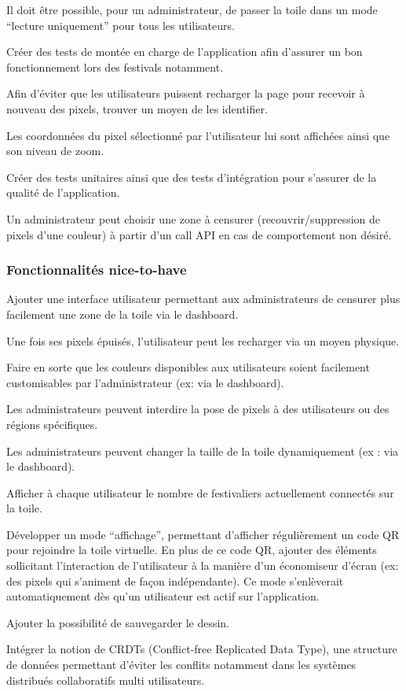 \begin{todolist}
  \item[\done] Il doit être possible, pour un administrateur, de passer la toile dans un mode “lecture uniquement” pour tous les utilisateurs.
  \item[\done] Créer des tests de montée en charge de l'application afin d'assurer un bon fonctionnement lors des festivals notamment.
  \item[\done] Afin d'éviter que les utilisateurs puissent recharger la page pour recevoir à nouveau des pixels, trouver un moyen de les identifier.
  \item[\done] Les coordonnées du pixel sélectionné par l'utilisateur lui sont affichées ainsi que son niveau de zoom.
  \item Créer des tests unitaires ainsi que des tests d'intégration pour s'assurer de la qualité de l'application.
  \item[\done] Un administrateur peut choisir une zone à censurer (recouvrir/suppression de pixels d'une couleur) à partir d'un call API en cas de comportement non désiré.
\end{todolist}

\subsubsection{Fonctionnalités \guillemotleft nice-to-have\guillemotright}

\begin{todolist}
  \item Ajouter une interface utilisateur permettant aux administrateurs de censurer plus facilement une zone de la toile via le dashboard.
  \item Une fois ses pixels épuisés, l'utilisateur peut les recharger via un moyen physique.
  \item[\done] Faire en sorte que les couleurs disponibles aux utilisateurs soient facilement customisables par l'administrateur (ex: via le dashboard).
  \item Les administrateurs peuvent interdire la pose de pixels à des utilisateurs ou des régions spécifiques.
  \item[\done] Les administrateurs peuvent changer la taille de la toile dynamiquement (ex : via le dashboard).
  \item[\done] Afficher à chaque utilisateur le nombre de festivaliers actuellement connectés sur la toile.
  \item[\done] Développer un mode “affichage”, permettant d'afficher régulièrement un code QR pour rejoindre la toile virtuelle. En plus de ce code QR, ajouter des éléments sollicitant l'interaction de l'utilisateur à la manière d'un économiseur d'écran (ex: des pixels qui s'animent de façon indépendante). Ce mode s'enlèverait automatiquement dès qu'un utilisateur est actif sur l'application.
  \item[\done] Ajouter la possibilité de sauvegarder le dessin.
  \item Intégrer la notion de CRDTs (Conflict-free Replicated Data Type), une structure de données permettant d'éviter les conflits notamment dans les systèmes distribués collaboratifs multi utilisateurs.
\end{todolist}

